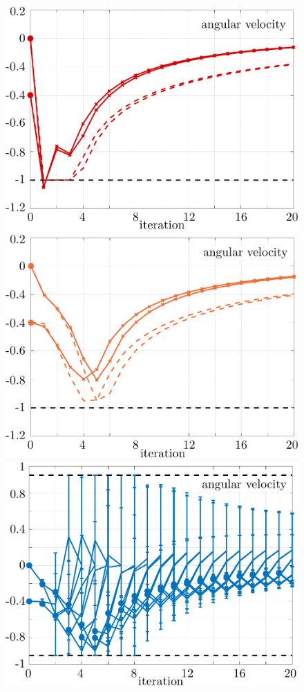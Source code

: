 \begin{figure}[t]
	\centering
	\includegraphics[scale=0.25]{../images/chap2_numex_ex4_A.pdf}
	\includegraphics[scale=0.25]{../images/chap2_numex_ex4_B.pdf}
	\includegraphics[scale=0.25]{../images/chap2_numex_ex4_C.pdf}

\end{figure}
